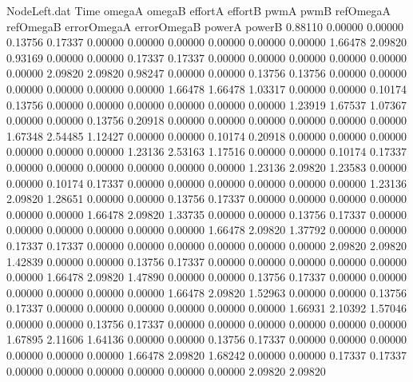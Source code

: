 \begin{filecontents}{NodeLeft.dat}
Time omegaA omegaB effortA effortB pwmA pwmB refOmegaA refOmegaB errorOmegaA errorOmegaB powerA powerB
   0.88110    0.00000    0.00000     0.13756    0.17337    0.00000    0.00000    0.00000    0.00000    0.00000    0.00000    1.66478    2.09820
   0.93169    0.00000    0.00000     0.17337    0.17337    0.00000    0.00000    0.00000    0.00000    0.00000    0.00000    2.09820    2.09820
   0.98247    0.00000    0.00000     0.13756    0.13756    0.00000    0.00000    0.00000    0.00000    0.00000    0.00000    1.66478    1.66478
   1.03317    0.00000    0.00000     0.10174    0.13756    0.00000    0.00000    0.00000    0.00000    0.00000    0.00000    1.23919    1.67537
   1.07367    0.00000    0.00000     0.13756    0.20918    0.00000    0.00000    0.00000    0.00000    0.00000    0.00000    1.67348    2.54485
   1.12427    0.00000    0.00000     0.10174    0.20918    0.00000    0.00000    0.00000    0.00000    0.00000    0.00000    1.23136    2.53163
   1.17516    0.00000    0.00000     0.10174    0.17337    0.00000    0.00000    0.00000    0.00000    0.00000    0.00000    1.23136    2.09820
   1.23583    0.00000    0.00000     0.10174    0.17337    0.00000    0.00000    0.00000    0.00000    0.00000    0.00000    1.23136    2.09820
   1.28651    0.00000    0.00000     0.13756    0.17337    0.00000    0.00000    0.00000    0.00000    0.00000    0.00000    1.66478    2.09820
   1.33735    0.00000    0.00000     0.13756    0.17337    0.00000    0.00000    0.00000    0.00000    0.00000    0.00000    1.66478    2.09820
   1.37792    0.00000    0.00000     0.17337    0.17337    0.00000    0.00000    0.00000    0.00000    0.00000    0.00000    2.09820    2.09820
   1.42839    0.00000    0.00000     0.13756    0.17337    0.00000    0.00000    0.00000    0.00000    0.00000    0.00000    1.66478    2.09820
   1.47890    0.00000    0.00000     0.13756    0.17337    0.00000    0.00000    0.00000    0.00000    0.00000    0.00000    1.66478    2.09820
   1.52963    0.00000    0.00000     0.13756    0.17337    0.00000    0.00000    0.00000    0.00000    0.00000    0.00000    1.66931    2.10392
   1.57046    0.00000    0.00000     0.13756    0.17337    0.00000    0.00000    0.00000    0.00000    0.00000    0.00000    1.67895    2.11606
   1.64136    0.00000    0.00000     0.13756    0.17337    0.00000    0.00000    0.00000    0.00000    0.00000    0.00000    1.66478    2.09820
   1.68242    0.00000    0.00000     0.17337    0.17337    0.00000    0.00000    0.00000    0.00000    0.00000    0.00000    2.09820    2.09820

\end{filecontents}
